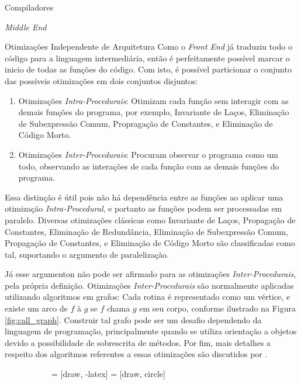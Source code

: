 \begin{section}{Compiladores}
\begin{subsection}{\textit{Middle End}}
\begin{subsubsection}{Otimizações Independente de Arquitetura}
Como o \textit{Front End} já traduziu todo o código para a linguagem
intermediária, então é perfeitamente possível marcar o inicio de
todas as funções do código. Com isto, é possível particionar o
conjunto das possíveis otimizações em dois conjuntos disjuntos:

\begin{enumerate}
    \item Otimizações \textit{Intra-Procedurais}: Otimizam cada função sem
interagir com as demais funções do programa, por exemplo, Invariante
de Laços, Eliminação de Subexpressão Comum, Propragação de Constantes,
e Eliminação de Código Morto.

    \item Otimizações \textit{Inter-Procedurais}: Procuram observar o programa
como um todo, observando as interações de cada função com as demais
funções do programa.
\end{enumerate}
Essa distinção é útil pois não há dependência entre as funções
ao aplicar uma otimização \textit{Intra-Procedural}, e portanto as
funções podem ser processadas em paralelo.
Diversas otimizações
clássicas como Invariante de Laços, Propagação de Constantes,
Eliminação de Redundância, Eliminação de Subexpressão Comum,
Propagação de Constantes, e Eliminação de Código Morto são
classificadas como tal, suportando o argumento de paralelização.

Já esse argumenton não pode
ser afirmado para as otimizações \textit{Inter-Procedurais}, pela
própria definição. 
Otimizações \textit{Inter-Procedurais} são normalmente aplicadas
utilizando algoritmos em grafos:
Cada rotina é representado como um vértice, e existe um arco de $f$
à $g$ se $f$ chama $g$ em seu corpo, conforme ilustrado na Figura
\ref{fig:call_graph}. Construir tal grafo pode ser
um desafio dependendo da linguagem de programação, principalmente
quando se utiliza orientação a objetos devido a possibilidade de
sobrescrita de métodos. Por fim, mais detalhes a respeito dos 
algoritmos referentes a essas otimizações são discutidos por
\cite{khedker2009data}.

\begin{figure}[ht]
\centering
  \begin{subfigure}[b]{0.40\textwidth}
     = [draw, -latex]
     = [draw, circle]
    \begin{center}
\end{center}
\end{subfigure}
\end{figure}
\end{subsubsection}
\end{subsection}
\end{section}
